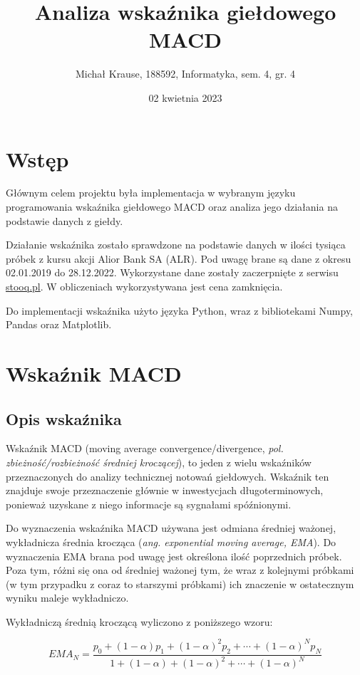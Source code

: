 \documentclass{article}
\title{Analiza wskaźnika giełdowego MACD}
\author{Michał Krause, 188592, Informatyka, sem. 4, gr. 4}
\date{02 kwietnia 2023}
\begin{document}
\maketitle

\section{Wstęp}

Głównym celem projektu była implementacja w wybranym języku programowania wskaźnika giełdowego MACD oraz analiza jego działania na podstawie danych z giełdy. 

Działanie wskaźnika zostało sprawdzone na podstawie danych w ilości tysiąca próbek z kursu akcji Alior Bank SA (ALR). Pod uwagę brane są dane z okresu 02.01.2019 do 28.12.2022. Wykorzystane dane zostały zaczerpnięte z serwisu \href{https://stooq.pl/q/?s=alr}{stooq.pl}. W obliczeniach wykorzystywana jest cena zamknięcia.

Do implementacji wskaźnika użyto języka Python, wraz z bibliotekami Numpy, Pandas oraz Matplotlib.

\section{Wskaźnik MACD}

\subsection{Opis wskaźnika}

Wskaźnik MACD (moving average convergence/divergence, \textit{pol. zbieżność/rozbieżność średniej kroczącej}), to jeden z wielu wskaźników przeznaczonych do analizy technicznej notowań giełdowych. Wskaźnik ten znajduje swoje przeznaczenie głównie w inwestycjach długoterminowych, ponieważ uzyskane z niego informacje są sygnałami spóźnionymi. 

Do wyznaczenia wskaźnika MACD używana jest odmiana średniej ważonej, wykładnicza średnia krocząca (\textit{ang. exponential moving average, EMA}). Do wyznaczenia EMA brana pod uwagę jest określona ilość poprzednich próbek. Poza tym, różni się ona od średniej ważonej tym, że wraz z kolejnymi próbkami (w tym przypadku z coraz to starszymi próbkami) ich znaczenie w ostatecznym wyniku maleje wykładniczo.

Wykładniczą średnią kroczącą wyliczono z poniższego wzoru:

\[EMA_N = \frac{p_0 + (1-\alpha)p_1 + (1-\alpha)^2p_2 + \cdots + (1-\alpha)^Np_N}
        {1 + (1-\alpha) + (1-\alpha)^2 + \cdots + (1-\alpha)^N}\]
\end{document}
